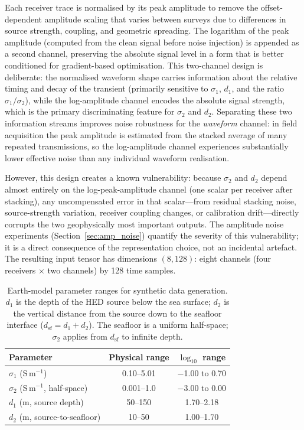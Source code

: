 \documentclass[journal]{IEEEtran}
\begin{document}
Each receiver trace is normalised by its peak amplitude to remove the
offset-dependent amplitude scaling that varies between surveys due to
differences in source strength, coupling, and geometric spreading.
The logarithm of the peak amplitude (computed from the clean signal
before noise injection) is appended as a second channel, preserving
the absolute signal level in a form that is better conditioned for
gradient-based optimisation. This two-channel design is deliberate:
the normalised waveform shape carries information about the relative
timing and decay of the transient (primarily sensitive to $\sigma_1$,
$d_1$, and the ratio $\sigma_1/\sigma_2$), while the log-amplitude
channel encodes the absolute signal strength, which is the primary
discriminating feature for $\sigma_2$ and $d_2$. Separating these
two information streams improves noise robustness for the
\emph{waveform} channel: in field acquisition the peak amplitude is
estimated from the stacked average of many repeated transmissions, so
the log-amplitude channel experiences substantially lower effective
noise than any individual waveform realisation.

However, this design creates a known vulnerability: because
$\sigma_2$ and $d_2$ depend almost entirely on the log-peak-amplitude
channel (one scalar per receiver after stacking), any uncompensated
error in that scalar---from residual stacking noise, source-strength
variation, receiver coupling changes, or calibration drift---directly
corrupts the two geophysically most important outputs. The amplitude
noise experiments (Section~\ref{sec:amp_noise}) quantify the severity
of this vulnerability; it is a direct consequence of the
representation choice, not an incidental artefact.
The resulting input tensor has dimensions
$(8, 128)$: eight channels (four receivers $\times$ two channels) by
128 time samples.

\begin{table}[t]
  \centering
  \footnotesize
  \caption{Earth-model parameter ranges for synthetic data
  generation. $d_1$ is the depth of the HED source below the sea
  surface; $d_2$ is the vertical distance from the source down to
  the seafloor interface ($d_\mathrm{sf} = d_1 + d_2$). The seafloor
  is a uniform half-space; $\sigma_2$ applies from $d_\mathrm{sf}$
  to infinite depth.}
  \label{tab:params}
  \begin{tabular}{lcc}
    \toprule
    Parameter & Physical range & $\log_{10}$ range \\
    \midrule
    $\sigma_1$ (S\,m$^{-1}$) & 0.10--5.01   & $-$1.00 to 0.70 \\
    $\sigma_2$ (S\,m$^{-1}$, half-space) & 0.001--1.0   & $-$3.00 to 0.00 \\
    $d_1$ (m, source depth) & 50--150      & 1.70--2.18 \\
    $d_2$ (m, source-to-seafloor) & 10--50       & 1.00--1.70 \\
    \bottomrule
  \end{tabular}
\end{table}
\end{document}

